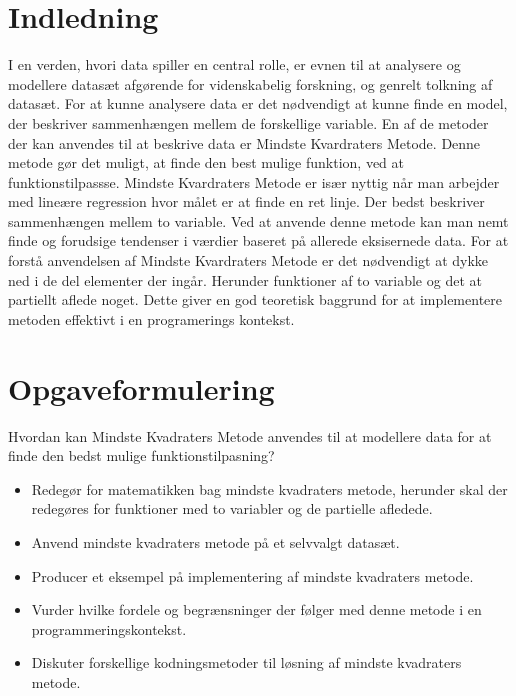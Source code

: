 \section{Indledning}\label{sec:indledning}
I en verden, hvori data spiller en central rolle, er evnen til at analysere og modellere datasæt afgørende for videnskabelig forskning, og genrelt tolkning af datasæt. For at kunne analysere data er det nødvendigt at kunne finde en model, der beskriver sammenhængen mellem de forskellige variable. En af de metoder der kan anvendes til at beskrive data er Mindste Kvardraters Metode. Denne metode gør det muligt, at finde den best mulige funktion, ved at funktionstilpassse. Mindste Kvardraters Metode er især nyttig når man arbejder med lineære regression hvor målet er at finde en ret linje. Der bedst beskriver sammenhængen mellem to variable. Ved at anvende denne metode kan man nemt finde og forudsige tendenser i værdier baseret på allerede eksisernede data. For at forstå anvendelsen af Mindste Kvardraters Metode er det nødvendigt at dykke ned i de del elementer der ingår. Herunder funktioner af to variable og det at partiellt aflede noget. Dette giver en god teoretisk baggrund for at implementere metoden effektivt i en programerings kontekst. %
\section{Opgaveformulering}\label{sec:opgaveformulering}
Hvordan kan Mindste Kvadraters Metode anvendes til at modellere data for at finde den bedst mulige funktionstilpasning?
\begin{itemize}
    \item Redegør for matematikken bag mindste kvadraters metode, herunder skal der redegøres for funktioner med to variabler og de partielle afledede.
    \item Anvend mindste kvadraters metode på et selvvalgt datasæt.
    \item Producer et eksempel på implementering af mindste kvadraters metode.
    \item Vurder hvilke fordele og begrænsninger der følger med denne metode i en programmeringskontekst.
    \item Diskuter forskellige kodningsmetoder til løsning af mindste kvadraters metode. 
\end{itemize}
\newpage